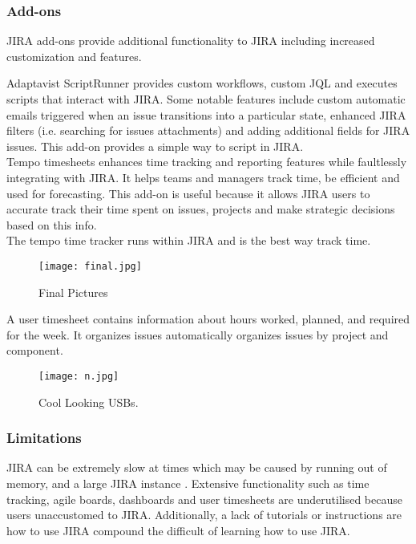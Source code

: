 \subsubsection{Add-ons}
JIRA add-ons provide additional functionality to JIRA including increased customization and features. 

Adaptavist ScriptRunner provides custom workflows, custom JQL and executes scripts that interact with JIRA. Some notable features include custom automatic emails triggered when an issue transitions into a particular state, enhanced JIRA filters (i.e. searching for issues attachments) and adding additional fields for JIRA issues. This add-on provides a simple way to script in JIRA. \\ 

\noindent Tempo timesheets enhances time tracking and reporting features while faultlessly integrating with JIRA. It helps teams and managers track time, be efficient and used for forecasting. This add-on is useful because it allows JIRA users to accurate track their time spent on issues, projects and make strategic decisions based on this info. \\
The tempo time tracker runs within JIRA and is the best way track time.

\begin{figure}[H]
	\centering
	\texttt{[image: final.jpg]}
	\caption{Final Pictures}
\end{figure}

A user timesheet contains information about hours worked, planned, and required for the week. It organizes issues automatically organizes issues by project and component.

\begin{figure}[H]
	\centering
	\texttt{[image: n.jpg]}
	\caption{Cool Looking USBs.}
\end{figure}

\subsubsection{Limitations}
JIRA can be extremely slow at times which may be caused by running out of memory, and a large JIRA instance \cite{issues:Online}. Extensive functionality such as time tracking, \gls{agile} boards, dashboards and user timesheets are underutilised because users unaccustomed to JIRA. Additionally, a lack of tutorials or instructions are how to use JIRA compound the difficult of learning how to use \gls{JIRA}. 

